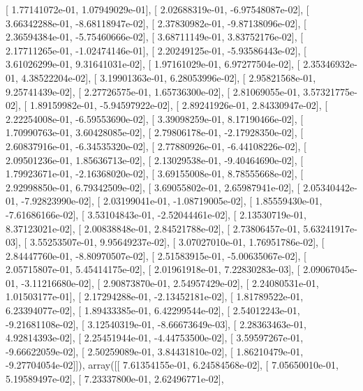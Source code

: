 \documentclass{article}
\begin{document}
       [  1.77141072e-01,   1.07949029e-01],
       [  2.02688319e-01,  -6.97548087e-02],
       [  3.66342288e-01,  -8.68118947e-02],
       [  2.37830982e-01,  -9.87138096e-02],
       [  2.36594384e-01,  -5.75460666e-02],
       [  3.68711149e-01,   3.83752176e-02],
       [  2.17711265e-01,  -1.02474146e-01],
       [  2.20249125e-01,  -5.93586443e-02],
       [  3.61026299e-01,   9.31641031e-02],
       [  1.97161029e-01,   6.97277504e-02],
       [  2.35346932e-01,   4.38522204e-02],
       [  3.19901363e-01,   6.28053996e-02],
       [  2.95821568e-01,   9.25741439e-02],
       [  2.27726575e-01,   1.65736300e-02],
       [  2.81069055e-01,   3.57321775e-02],
       [  1.89159982e-01,  -5.94597922e-02],
       [  2.89241926e-01,   2.84330947e-02],
       [  2.22254008e-01,  -6.59553690e-02],
       [  3.39098259e-01,   8.17190466e-02],
       [  1.70990763e-01,   3.60428085e-02],
       [  2.79806178e-01,  -2.17928350e-02],
       [  2.60837916e-01,  -6.34535320e-02],
       [  2.77880926e-01,  -6.44108226e-02],
       [  2.09501236e-01,   1.85636713e-02],
       [  2.13029538e-01,  -9.40464690e-02],
       [  1.79923671e-01,  -2.16368020e-02],
       [  3.69155008e-01,   8.78555668e-02],
       [  2.92998850e-01,   6.79342509e-02],
       [  3.69055802e-01,   2.65987941e-02],
       [  2.05340442e-01,  -7.92823990e-02],
       [  2.03199041e-01,  -1.08719005e-02],
       [  1.85559430e-01,  -7.61686166e-02],
       [  3.53104843e-01,  -2.52044461e-02],
       [  2.13530719e-01,   8.37123021e-02],
       [  2.00838848e-01,   2.84521788e-02],
       [  2.73806457e-01,   5.63241917e-03],
       [  3.55253507e-01,   9.95649237e-02],
       [  3.07027010e-01,   1.76951786e-02],
       [  2.84447760e-01,  -8.80970507e-02],
       [  2.51583915e-01,  -5.00635067e-02],
       [  2.05715807e-01,   5.45414175e-02],
       [  2.01961918e-01,   7.22830283e-03],
       [  2.09067045e-01,  -3.11216680e-02],
       [  2.90873870e-01,   2.54957429e-02],
       [  2.24080531e-01,   1.01503177e-01],
       [  2.17294288e-01,  -2.13452181e-02],
       [  1.81789522e-01,   6.23394077e-02],
       [  1.89433385e-01,   6.42299544e-02],
       [  2.54012243e-01,  -9.21681108e-02],
       [  3.12540319e-01,  -8.66673649e-03],
       [  2.28363463e-01,   4.92814393e-02],
       [  2.25451944e-01,  -4.44753500e-02],
       [  3.59597267e-01,  -9.66622059e-02],
       [  2.50259089e-01,   3.84431810e-02],
       [  1.86210479e-01,  -9.27704054e-02]]), array([[  7.61354155e-01,   6.24584568e-02],
       [  7.05650010e-01,   5.19589497e-02],
       [  7.23337800e-01,   2.62496771e-02],
\end{document}
